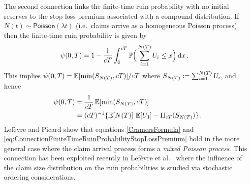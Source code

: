 The second connection links the finite-time ruin probability with no initial reserves to the stop-loss premium associated with a compound distribution.
If $N(t) \sim \mathsf{Poisson}(\lambda t)$ (i.e.\ claims arrive as a homogeneous Poisson process) then the finite-time ruin probability is given by
\begin{align} \label{CramersFormula}
\psi(0, T)
&= 1 - \frac{1}{cT} \int_0^{cT} \operatorname{{\mathbb P}} \Bigl( \, \sum_{i=1}^{N(T)} U_i \le x \Bigr) \mathop{}\!\mathrm{d} x \,.
\end{align}
This implies $\psi(0,T) = \operatorname{{\mathbb E}} [ \min( S_{N(T)}, cT ) ]/cT$ where $S_{N(T)} := \sum_{i=1}^{N(T)} U_i$, and hence
\begin{align} \label{eq:ConnectionFiniteTimeRuinProbabilityStopLossPremium}
\psi(0, T)
&= \frac{1}{cT} \operatorname{{\mathbb E}}[ \min( S_{N(T)}, cT ) ] \nonumber \\
&= (cT)^{-1} \{ \operatorname{{\mathbb E}}[N(T)] \, \operatorname{{\mathbb E}}[U_1] - \Pi_{cT}(S_{N(T)}) \} \,.
\end{align}
Lef\`evre and Picard \cite[Corollary~4.3]{LePi11} show that equations \eqref{CramersFormula} and \eqref{eq:ConnectionFiniteTimeRuinProbabilityStopLossPremium} hold in the more general case where the claim arrival process forms a \textit{mixed Poisson process}. This connection has been exploited recently in Lef\`evre et al.\ \cite{LeTrZu17} where the influence of the claim size distribution on the ruin probabilities is studied via stochastic ordering considerations.
